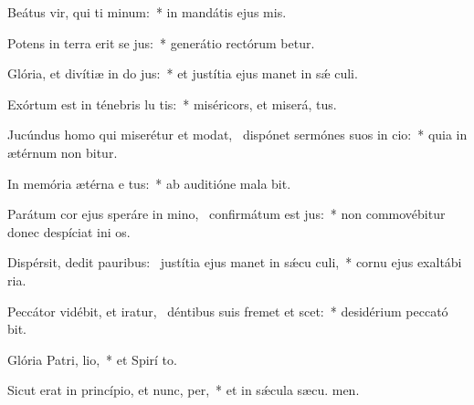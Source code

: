 \item Beátus vir, qui ti minum:~* in mandátis ejus  mis.
\item Potens in terra erit se jus:~* generátio rectórum betur.
\item Glória, et divítiæ in do jus:~* et justítia ejus manet in sǽ culi.
\item Exórtum est in ténebris lu tis:~* miséricors, et miserá,  tus.
\item Jucúndus homo qui miserétur et modat,~\pscross{} dispónet sermónes suos in cio:~* quia in ætérnum non bitur.
\item In memória ætérna e tus:~* ab auditióne mala  bit.
\item Parátum cor ejus speráre in mino,~\pscross{} confirmátum est  jus:~* non commovébitur donec despíciat ini os.
\item Dispérsit, dedit pauribus:~\pscross{} justítia ejus manet in sǽcu culi,~* cornu ejus exaltábi  ria.
\item Peccátor vidébit, et iratur,~\pscross{} déntibus suis fremet et scet:~* desidérium peccató bit.
\item Glória Patri,  lio,~* et Spirí to.
\item Sicut erat in princípio, et nunc,  per,~* et in sǽcula sæcu. men.
